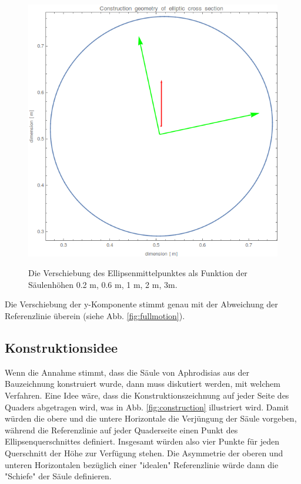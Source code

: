 \documentclass[twocolumn]{bmcart}
\begin{document}
\begin{figure}[h]
\begin{minipage}{.26\textwidth}
  \label{fig:sfig4}
\end{minipage}
\begin{minipage}{.26\textwidth}
  \centering
  \includegraphics[width=1\linewidth]{figures/V02.png}
  \label{fig:sfig5}
\end{minipage}
\caption{Die Verschiebung des Ellipsenmittelpunktes als Funktion der Säulenhöhen 0.2 m, 0.6 m, 1 m, 2 m, 3m.}
\label{fig:figversch}
\end{figure}

Die Verschiebung der y-Komponente stimmt genau mit der Abweichung der Referenzlinie überein (siehe Abb. \ref{fig:fullmotion}).

\subsection{Konstruktionsidee}

Wenn die Annahme stimmt, dass die Säule von Aphrodisias aus der Bauzeichnung konstruiert wurde, dann muss diskutiert werden, mit welchem Verfahren. 
Eine Idee wäre, dass die Konstruktionszeichnung auf jeder Seite des Quaders abgetragen wird, was in Abb. \ref{fig:construction} illustriert wird. Damit würden die obere und die untere Horizontale die Verjüngung der Säule vorgeben, während die Referenzlinie auf jeder Quaderseite einen Punkt des Ellipsenquerschnittes definiert. Insgesamt würden also vier Punkte für jeden Querschnitt der Höhe zur Verfügung stehen. Die Asymmetrie der oberen und unteren Horizontalen bezüglich einer "idealen" Referenzlinie würde dann die "Schiefe" der Säule definieren. 
\end{document}
